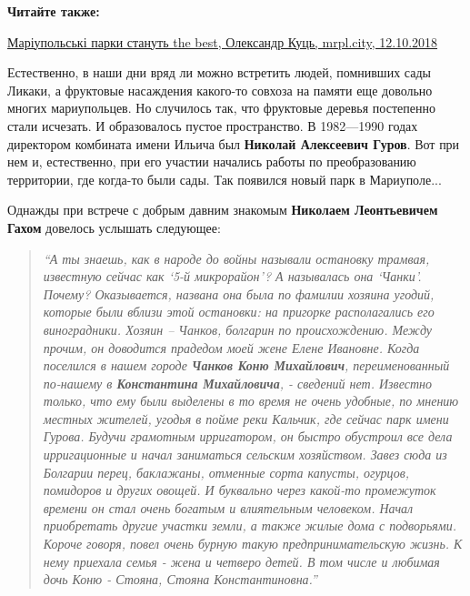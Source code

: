 \vspace{0.5cm}
\begin{minipage}{0.9\textwidth}
	
\textbf{Читайте также:}

\href{https://mrpl.city/blogs/view/mariupolski-parki-stanut-the-best}{Маріупольські парки стануть the best, Олександр Куць, mrpl.city, 12.10.2018}
\end{minipage}
\vspace{0.5cm}

Естественно, в наши дни вряд ли можно встретить людей, помнивших сады Ликаки, а
фруктовые насаждения какого-то совхоза на памяти еще довольно многих
мариупольцев. Но случилось так, что фруктовые деревья постепенно стали
исчезать. И образовалось пустое пространство.  В 1982—1990 годах директором
комбината имени Ильича был \textbf{Николай Алексеевич Гуров}. Вот при нем и,
естественно, при его участии начались работы по преобразованию территории, где
когда-то были сады. Так появился новый парк в Мариуполе...

Однажды при встрече с добрым давним знакомым \textbf{Николаем Леонтьевичем Гахом}
довелось услышать следующее: 

\begin{quote}
\em\enquote{А ты знаешь, как в народе до войны называли
остановку трамвая, известную сейчас как \enquote{5-й микрорайон}? А называлась она
\enquote{Чанки}. Почему? Оказывается, названа она была по фамилии хозяина угодий,
которые были вблизи этой остановки: на пригорке располагались его виноградники.
Хозяин – Чанков, болгарин по происхождению. Между прочим, он доводится прадедом
моей жене Елене Ивановне. Когда поселился в нашем городе \textbf{Чанков Коню
Михайлович}, переименованный по-нашему в \textbf{Константина Михайловича}, - сведений
нет. Известно только, что ему были выделены в то время не очень удобные, по
мнению местных жителей, угодья в пойме реки Кальчик, где сейчас парк имени
Гурова. Будучи грамотным ирригатором, он быстро обустроил все дела
ирригационные и начал заниматься сельским хозяйством. Завез сюда из Болгарии
перец, баклажаны, отменные сорта капусты, огурцов, помидоров и других овощей. И
буквально через какой-то промежуток времени он стал очень богатым и влиятельным
человеком. Начал приобретать другие участки земли, а также жилые дома с
подворьями. Короче говоря, повел очень бурную такую предпринимательскую жизнь.
К нему приехала семья - жена и четверо детей. В том числе и любимая дочь Коню -
Стояна, Стояна Константиновна.}

\end{quote}

